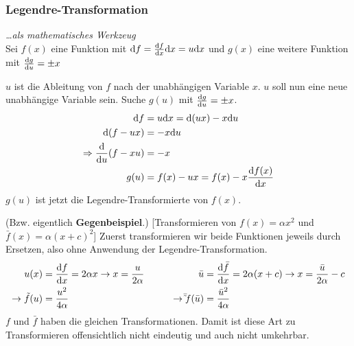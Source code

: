 \subsubsection{Legendre-Transformation} \textit{\dots als mathematisches Werkzeug}\\
Sei $f(x)$ eine Funktion mit $\mathrm d f = \frac{\mathrm d f}{\mathrm d x} \mathrm d x = u \mathrm d x$ und $g(x)$ eine weitere Funktion mit $\frac{\mathrm d g}{\mathrm d u} = \pm x$

$u$ ist die Ableitung von $f$ nach der unabhängigen Variable $x$. $u$ soll nun eine neue unabhängige Variable sein. Suche $g(u)$ mit $\frac{\mathrm d g}{\mathrm d u} = \pm x$.
\begin{align*}
\mathrm d f &= u\mathrm d x = \mathrm d (ux) - x\mathrm d u\\
\mathrm d (f-ux) &= - x \mathrm d u\\
\Rightarrow \frac{\mathrm d}{\mathrm d u}(f-xu) &= -x\\
g(u) &= f(x) - ux = f(x) - x\frac{\mathrm d f(x)}{\mathrm d x}
\end{align*}
$g(u)$ ist jetzt die Legendre-Transformierte von $f(x)$.
	
	
	
\begin{beispiel*} (Bzw. eigentlich {\bf Gegenbeispiel}.) [Transformieren von $f(x) = \alpha x^2$ und $\bar{f}(x) = \alpha(x+c)^2$]
	Zuerst transformieren wir beide Funktionen jeweils durch Ersetzen, also ohne Anwendung der Legendre-Transformation.
\begin{align*}
u(x) &= \frac{\mathrm d f}{\mathrm d x} = 2 \alpha x \rightarrow x= \frac{u}{2\alpha} & \qquad   \bar u &= \frac{\mathrm d \bar f}{\mathrm d x} = 2\alpha(x+c) \rightarrow x=\frac{\bar u}{2\alpha} - c\\
\rightarrow \tilde f(u) &= \frac{u^2}{4\alpha} & \qquad  \rightarrow \bar \tilde f(\bar u) &= \frac{\bar u^2}{4\alpha}
\end{align*}
$f$ und $\bar f$ haben die gleichen Transformationen. Damit ist diese Art zu Transformieren offensichtlich nicht eindeutig und auch nicht umkehrbar.\\
\end{beispiel*}

